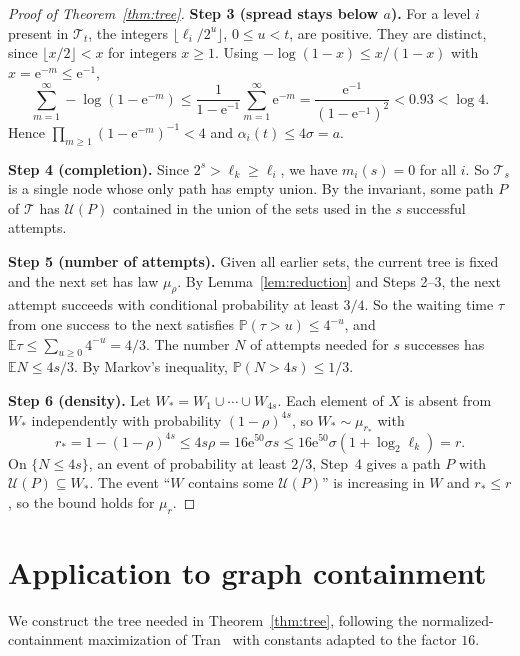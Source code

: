 \documentclass[11pt]{article}
\numberwithin{equation}{section}
\newcommand{\PP}{\mathbb P}
\newcommand{\EE}{\mathbb E}
\newcommand{\TT}{\mathcal T}
\newcommand{\UU}{\mathcal U}
\newcommand{\ee}{\mathrm e}
\newcommand{\Step}[1]{\par\smallskip\noindent\textbf{Step #1.}}
\begin{document}
\begin{proof}[Proof of Theorem~\ref{thm:tree}]
\Step{3 (spread stays below $a$)} For a level $i$ present in $\TT_t$, the
integers $\lfloor\ell_i/2^u\rfloor$, $0\le u<t$, are positive. They are
distinct, since $\lfloor x/2\rfloor<x$ for integers $x\ge1$. Using
$-\log(1-x)\le x/(1-x)$ with $x=\ee^{-m}\le\ee^{-1}$,
\[
 \sum_{m=1}^{\infty}-\log(1-\ee^{-m})
 \le\frac1{1-\ee^{-1}}\sum_{m=1}^\infty\ee^{-m}
 =\frac{\ee^{-1}}{(1-\ee^{-1})^2}<0.93<\log4 .
\]
Hence $\prod_{m\ge1}(1-\ee^{-m})^{-1}<4$ and $\alpha_i(t)\le4\sigma=a$.

\Step{4 (completion)} Since $2^s>\ell_k\ge\ell_i$, we have $m_i(s)=0$ for all
$i$. So $\TT_s$ is a single node whose only path has empty union. By the
invariant, some path $P$ of $\TT$ has $\UU(P)$ contained in the union of the
sets used in the $s$ successful attempts.

\Step{5 (number of attempts)} Given all earlier sets, the current tree is fixed
and the next set has law $\mu_\rho$. By Lemma~\ref{lem:reduction} and Steps
2--3, the next attempt succeeds with conditional probability at least $3/4$.
So the waiting time $\tau$ from one success to the next satisfies
$\PP(\tau>u)\le4^{-u}$, and $\EE\tau\le\sum_{u\ge0}4^{-u}=4/3$. The number $N$
of attempts needed for $s$ successes has $\EE N\le4s/3$. By Markov's
inequality, $\PP(N>4s)\le1/3$.

\Step{6 (density)} Let $W_*=W_1\cup\cdots\cup W_{4s}$. Each element of $X$ is
absent from $W_*$ independently with probability $(1-\rho)^{4s}$, so
$W_*\sim\mu_{r_*}$ with
\[
 r_*=1-(1-\rho)^{4s}\le4s\rho=16\ee^{50}\sigma s
 \le16\ee^{50}\sigma(1+\log_2\ell_k)=r .
\]
On $\{N\le4s\}$, an event of probability at least $2/3$, Step~4 gives a path $P$
with $\UU(P)\subseteq W_*$. The event ``$W$ contains some $\UU(P)$'' is
increasing in $W$ and $r_*\le r$, so the bound holds for $\mu_r$.
\end{proof}

\section{Application to graph containment}\label{sec:graphs}

We construct the tree needed in Theorem~\ref{thm:tree}, following the
normalized-containment maximization of Tran~\cite[Section~3, Lemma~3.1]{Tran26}
with constants adapted to the factor $16$.
\end{document}
